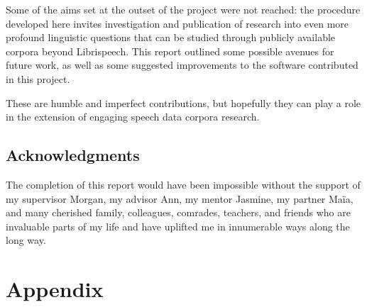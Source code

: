 \documentclass[11pt]{article}
\begin{document}
Some of the aims set at the outset of the project were not reached: the procedure developed here invites investigation and publication of research into even more profound linguistic questions that can be studied through publicly available corpora beyond Librispeech. This report outlined some possible avenues for future work, as well as some suggested improvements to the software contributed in this project.

These are humble and imperfect contributions, but hopefully they can play a role in the extension of engaging speech data corpora research.


\subsection{Acknowledgments}

The completion of this report would have been impossible without the support of my supervisor Morgan, my advisor Ann, my mentor Jasmine, my partner Ma\"ia, and many cherished family, colleagues, comrades, teachers, and friends who are invaluable parts of my life and have uplifted me in innumerable ways along the long way.

\newpage
\section{Appendix}
\end{document}
